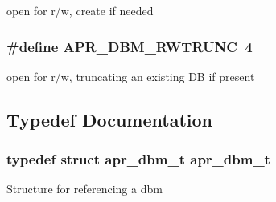 open for r/w, create if needed \hypertarget{group___a_p_r___util___d_b_m_ga8bffe207158704162c24fa74dc1b9264}{
\subsubsection[{A\-P\-R\-\_\-\-D\-B\-M\-\_\-\-R\-W\-T\-R\-U\-N\-C}]{\setlength{\rightskip}{0pt plus 5cm}\#define A\-P\-R\-\_\-\-D\-B\-M\-\_\-\-R\-W\-T\-R\-U\-N\-C~4}}\label{group___a_p_r___util___d_b_m_ga8bffe207158704162c24fa74dc1b9264}
open for r/w, truncating an existing D\-B if present 

\subsection{Typedef Documentation}
\hypertarget{group___a_p_r___util___d_b_m_ga47f6ff771143ed7b7987c686c20c8536}{
\subsubsection[{apr\-\_\-dbm\-\_\-t}]{\setlength{\rightskip}{0pt plus 5cm}typedef struct {\bf apr\-\_\-dbm\-\_\-t} {\bf apr\-\_\-dbm\-\_\-t}}}\label{group___a_p_r___util___d_b_m_ga47f6ff771143ed7b7987c686c20c8536}
Structure for referencing a dbm 

